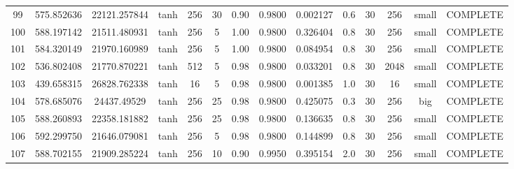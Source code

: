 \begin{longtable}{cccccccccccccc}
                       99 &                 575.852636 &                       22121.257844 &            tanh &         256 &             30 &        0.90 & 0.9800 &       0.002127 &             0.6 &                 30 &      256 &     small & COMPLETE \\
                      100 &                 588.197142 &                       21511.480931 &            tanh &         256 &              5 &        1.00 & 0.9800 &       0.326404 &             0.8 &                 30 &      256 &     small & COMPLETE \\
                      101 &                 584.320149 &                       21970.160989 &            tanh &         256 &              5 &        1.00 & 0.9800 &       0.084954 &             0.8 &                 30 &      256 &     small & COMPLETE \\
                      102 &                 536.802408 &                       21770.870221 &            tanh &         512 &              5 &        0.98 & 0.9800 &       0.033201 &             0.8 &                 30 &     2048 &     small & COMPLETE \\
                      103 &                 439.658315 &                       26828.762338 &            tanh &          16 &              5 &        0.98 & 0.9800 &       0.001385 &             1.0 &                 30 &       16 &     small & COMPLETE \\
                      104 &                 578.685076 &                        24437.49529 &            tanh &         256 &             25 &        0.98 & 0.9800 &       0.425075 &             0.3 &                 30 &      256 &       big & COMPLETE \\
                      105 &                 588.260893 &                       22358.181882 &            tanh &         256 &             25 &        0.98 & 0.9800 &       0.136635 &             0.8 &                 30 &      256 &     small & COMPLETE \\
                      106 &                 592.299750 &                       21646.079081 &            tanh &         256 &              5 &        0.98 & 0.9800 &       0.144899 &             0.8 &                 30 &      256 &     small & COMPLETE \\
                      107 &                 588.702155 &                       21909.285224 &            tanh &         256 &             10 &        0.90 & 0.9950 &       0.395154 &             2.0 &                 30 &      256 &     small & COMPLETE \\

\end{longtable}
